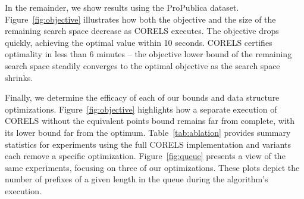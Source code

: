 \begin{table}[t!]
\centering
{}
\vspace{4mm}
\caption{Per-component performance improvement.
%
The columns report total execution time,
time to optimum, number of queue insertions,
maximum queue size, and maximum evaluated prefix length.
%
The first row shows CORELS; subsequent rows show variants
that each remove a specific implementation optimization or bound.
%
We terminated each experiment in the last row after consuming 390-410GB RAM.
%
In all but the final row and column, we report means
(and standard deviations) over 10 cross-validation folds;
in the final row, we report the minimum values across folds.
}
\label{tab:ablation}
\vspace{-8mm}
\end{table}

In the remainder, we show results using the ProPublica dataset.
%
Figure~\ref{fig:objective} illustrates how both the objective and the size of
the remaining search space decrease as CORELS executes.
The objective drops quickly, achieving the optimal value within 10 seconds.
CORELS certifies optimality in less than 6 minutes --
the objective lower bound of the remaining search space
steadily converges to the optimal objective as the search space shrinks.

Finally, we determine the efficacy of each of our bounds and data structure optimizations.
%
Figure~\ref{fig:objective} highlights how a separate execution of CORELS without
the equivalent points bound remains far from complete,
with its lower bound far from the optimum.
%
Table~\ref{tab:ablation} provides summary statistics for experiments using
the full CORELS implementation and variants each remove a specific optimization.
%
Figure~\ref{fig:queue} presents a view of the same experiments, focusing
on three of our optimizations. These plots depict the number of
prefixes of a given length in the queue during the algorithm's execution.

